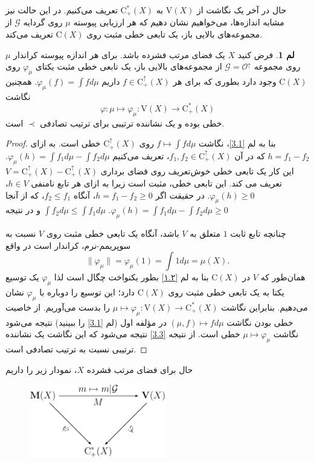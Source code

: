 \documentclass[12pt,a4paper]{article}
\theoremstyle{definition}
\theoremstyle{theorem}
\newtheorem{lemma}[definition]{لم}
\theoremstyle{definition}
\newcommand{\cO}{\mathcal{O}}
\newcommand{\cG}{\mathcal{G}}
\newcommand{\rC}{\mathrm{C}}
\begin{document}
حال در آخر یک نگاشت از
$ \mathrm{V}(X) $
 به
$ \rC_{+}^{*}(X)  $
تعریف می‌کنیم.  در این حالت نیز مشابه اندازه‌ها،  می‌خواهیم نشان دهیم که هر ارزیابی پیوسته 
$ \mu $
روی گردایه 
$ \cG $
از مجموعه‌های بالایی باز،   یک تابعی خطی مثبت روی 
$ \rC(X) $
تعریف می‌کند.  
\begin{lemma}\label{5.3} 
فرض کنید 
$ X $
یک فضای مرتب فشرده باشد. برای هر اندازه پیوسته کراندار 
$ \mu $
روی مجموعه 
$ \cG=\cO^{\uparrow} $
از مجموعه‌های بالایی باز،    یک تابعی خطی مثبت یکتای  
$ \varphi_{\mu} $
روی 
$ \rC(X) $
وجود دارد بطوری که برای هر  
$ f\in \rC_{+}^{\uparrow}(X)  $
داریم
$ \varphi_{\mu}(f)=\int{f}d\mu $. همچنین نگاشت 
$$\varphi:\mu\mapsto \varphi_{\mu}:\mathrm{V}(X)\rightarrow \rC_{+}^{*}(X)$$
خطی بوده  و یک نشاننده ترتیبی برای ترتیب تصادفی 
$ \prec $
است.
\end{lemma}
\begin{proof}
بنا به لم
\ref{3.1}،  نگاشت 
$ f\mapsto \int{f}d\mu $
روی 
$ \rC_{+}^{\uparrow}(X) $
خطی است.  به ازای 
$ h=f_{1}-f_{2} $
که در آن 
$ f_{1},f_{2}\in \rC_{+}^{\uparrow}(X) $، تعریف می‌کنیم
$ \varphi_{\mu}(h)=\int{f_{1}}d\mu - \int{f_{2}}d\mu $.  این کار یک تابعی خطی خوش‌تعریف روی فضای برداری 
$ V=\rC_{+}^{\uparrow}(X) - \rC_{+}^{\uparrow}(X) $
تعریف می کند.  این تابعی خطی، مثبت است زیرا  به ازای هر تابع نامنفی 
$ h\in V $،  
$ \varphi_{\mu}(h)\geq 0 $.  در حقیقت اگر 
$ h=f_{1}-f_{2}\geq 0 $،  آنگاه 
$ f_{2}\leq f_{1} $، که از آنجا 
$ \int{f_{2}}d\mu\leq \int{f_{1}}d\mu  $
 و در نتیجه 
$ .\varphi_{\mu}(h)=\int{f_{1}}d\mu - \int{f_{2}}d\mu\geq 0 $


چنانچه تابع ثابت
$ 1 $
متعلق به 
$ V $
باشد، آنگاه یک تابعی خطی مثبت روی 
$ V $
نسبت به سوپریمم-نرم، کراندار است در واقع 
$$ \parallel\!\varphi_{\mu}\!\parallel=\varphi_{\mu}(1)=\int{1}d\mu=\mu(X). $$
 همان‌طور که 
$ V $
در
$ \rC(X) $
بنا به لم
\ref{۱.۲}
بطور یکنواخت چگال است لذا 
$ \varphi_{\mu} $
یک توسیع یکتا به یک تابعی خطی مثبت روی 
$ \rC(X)  $
دارد؛ این توسیع را دوباره با 
$ \varphi_{\mu} $\index{$ \varphi_{\mu} $}
نشان می‌دهیم. 
بنابراین نگاشت 
$ \mu\mapsto \varphi_{\mu}: \mathrm{V}(X)\rightarrow \rC_{+}^{*}(X)$
را بدست می‌آوریم.  از خاصیت خطی بودن نگاشت 
$ (\mu,f)\mapsto f d\mu$
در مؤلفه اول (لم
\ref{3.1}
را ببینید) نتیجه می‌شود نگاشت 
$ \mu\mapsto\varphi_{\mu} $ 
خطی است.  از نتیجه 
\ref{3.3}
نتیجه می‌شود که این نگاشت یک نشاننده ترتیبی نسبت به ترتیب تصادفی است. 
\end{proof}
حال برای فضای مرتب فشرده 
$ X $،  نمودار زیر را داریم
\begin{figure}[!h]
\centerline{\includegraphics[height=3.2cm]{diagram.pdf}}
\end{figure}
\end{document}
